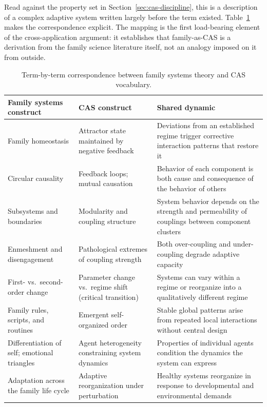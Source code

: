 \documentclass[12pt, letterpaper]{article}
\begin{document}
Read against the property set in Section~\ref{sec:cas-discipline}, this is a description of a complex adaptive system written largely before the term existed. Table~\ref{tab:family-cas-mapping} makes the correspondence explicit. The mapping is the first load-bearing element of the cross-application argument: it establishes that family-as-CAS is a derivation from the family science literature itself, not an analogy imposed on it from outside.

\begin{table}[htbp]
\centering
\small
\caption{Term-by-term correspondence between family systems theory and CAS vocabulary.}
\label{tab:family-cas-mapping}
\begin{tabular}{p{4.6cm}p{3.8cm}p{5.4cm}}
\toprule
Family systems construct & CAS construct & Shared dynamic \\
\midrule
Family homeostasis \parencite{jackson1957} & Attractor state maintained by negative feedback & Deviations from an established regime trigger corrective interaction patterns that restore it \\
\midrule
Circular causality \parencite{cox1997} & Feedback loops; mutual causation & Behavior of each component is both cause and consequence of the behavior of others \\
\midrule
Subsystems and boundaries \parencite{minuchin1974} & Modularity and coupling structure & System behavior depends on the strength and permeability of couplings between component clusters \\
\midrule
Enmeshment and disengagement \parencite{minuchin1974} & Pathological extremes of coupling strength & Both over-coupling and under-coupling degrade adaptive capacity \\
\midrule
First- vs.\ second-order change \parencite{watzlawick1974} & Parameter change vs.\ regime shift (critical transition) & Systems can vary within a regime or reorganize into a qualitatively different regime \\
\midrule
Family rules, scripts, and routines & Emergent self-organized order & Stable global patterns arise from repeated local interactions without central design \\
\midrule
Differentiation of self; emotional triangles \parencite{bowen1978} & Agent heterogeneity constraining system dynamics & Properties of individual agents condition the dynamics the system can express \\
\midrule
Adaptation across the family life cycle \parencite{cox1997,olson2000} & Adaptive reorganization under perturbation & Healthy systems reorganize in response to developmental and environmental demands \\
\bottomrule
\end{tabular}
\end{table}
\end{document}

